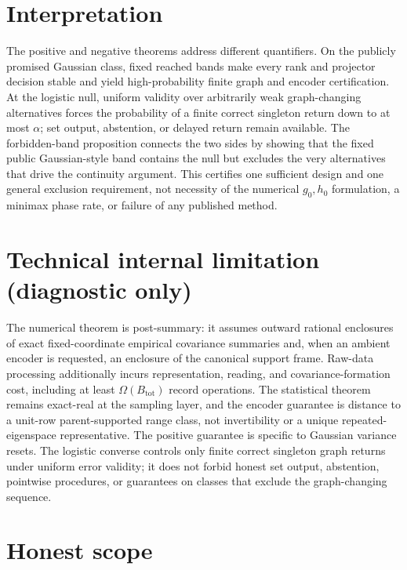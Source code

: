 \documentclass{article}
\begin{document}
\section{Interpretation}

The positive and negative theorems address different quantifiers. On the publicly promised Gaussian class, fixed reached bands make every rank and projector decision stable and yield high-probability finite graph and encoder certification. At the logistic null, uniform validity over arbitrarily weak graph-changing alternatives forces the probability of a finite correct singleton return down to at most \(\alpha\); set output, abstention, or delayed return remain available. The forbidden-band proposition connects the two sides by showing that the fixed public Gaussian-style band contains the null but excludes the very alternatives that drive the continuity argument. This certifies one sufficient design and one general exclusion requirement, not necessity of the numerical \(g_0,h_0\) formulation, a minimax phase rate, or failure of any published method.

\section*{Technical internal limitation (diagnostic only)}

The numerical theorem is post-summary: it assumes outward rational enclosures of exact fixed-coordinate empirical covariance summaries and, when an ambient encoder is requested, an enclosure of the canonical support frame. Raw-data processing additionally incurs representation, reading, and covariance-formation cost, including at least \(\Omega(B_{\mathrm{tot}})\) record operations. The statistical theorem remains exact-real at the sampling layer, and the encoder guarantee is distance to a unit-row parent-supported range class, not invertibility or a unique repeated-eigenspace representative. The positive guarantee is specific to Gaussian variance resets. The logistic converse controls only finite correct singleton graph returns under uniform error validity; it does not forbid honest set output, abstention, pointwise procedures, or guarantees on classes that exclude the graph-changing sequence.

\section{Honest scope}
\end{document}
